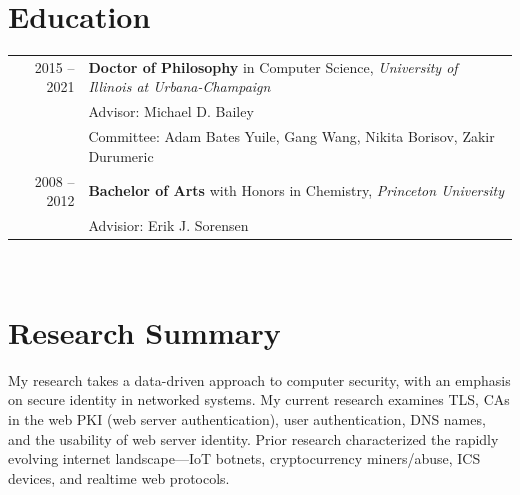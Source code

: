 \documentclass[10pt,singlecolumn]{article} %
\begin{document}

\section{Education} 

\begin{tabular}{rl} %


2015 -- 2021 & \textbf{Doctor of Philosophy} in Computer Science, \textit{University of Illinois at Urbana-Champaign}\\ 
& Advisor: Michael D. Bailey \\
& Committee: Adam Bates Yuile, Gang Wang, Nikita Borisov, Zakir Durumeric \\
	 

2008 -- 2012 & \textbf{Bachelor of Arts} with Honors in Chemistry,  \textit{Princeton University}\\
& Advisior: Erik J. Sorensen \\
	  
\end{tabular} \\

\section{Research Summary} 

My research takes a data-driven approach to computer security, with an emphasis on 
secure identity in networked systems. My current research examines TLS, CAs in the web PKI (web server authentication),
user authentication, DNS names, and the usability of web server identity. Prior research
characterized the rapidly evolving internet landscape---IoT botnets, cryptocurrency miners/abuse, ICS devices, 
and realtime web protocols. 

\vspace{0.2cm}
\end{document}
